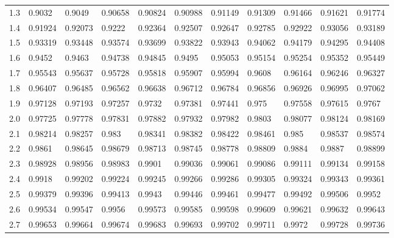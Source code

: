\documentclass[%
11pt,%
twoside,%
titlepage,%
german,%
headsepline%
]{scrartcl}
\newcommand{\spaltenheight}{\rule{0mm}{3ex}}
\begin{document}
\begin{table}[]
{\begin{tabular}{l|llllllllll}
\rowcolor{Gray}\spaltenheight 1.3 & 0.9032  & 0.9049  & 0.90658 & 0.90824 & 0.90988 & 0.91149 & 0.91309 & 0.91466 & 0.91621 & 0.91774 \\
\rowcolor{lightyellow}\spaltenheight 1.4 & 0.91924 & 0.92073 & 0.9222  & 0.92364 & 0.92507 & 0.92647 & 0.92785 & 0.92922 & 0.93056 & 0.93189 \\
\rowcolor{Gray}\spaltenheight 1.5 & 0.93319 & 0.93448 & 0.93574 & 0.93699 & 0.93822 & 0.93943 & 0.94062 & 0.94179 & 0.94295 & 0.94408 \\
\rowcolor{lightyellow}\spaltenheight 1.6 & 0.9452  & 0.9463  & 0.94738 & 0.94845 & 0.9495  & 0.95053 & 0.95154 & 0.95254 & 0.95352 & 0.95449 \\
\rowcolor{Gray}\spaltenheight 1.7 & 0.95543 & 0.95637 & 0.95728 & 0.95818 & 0.95907 & 0.95994 & 0.9608  & 0.96164 & 0.96246 & 0.96327 \\
\rowcolor{lightyellow}\spaltenheight 1.8 & 0.96407 & 0.96485 & 0.96562 & 0.96638 & 0.96712 & 0.96784 & 0.96856 & 0.96926 & 0.96995 & 0.97062 \\
\rowcolor{Gray}\spaltenheight 1.9 & 0.97128 & 0.97193 & 0.97257 & 0.9732  & 0.97381 & 0.97441 & 0.975   & 0.97558 & 0.97615 & 0.9767  \\
\rowcolor{lightyellow}\spaltenheight 2.0   & 0.97725 & 0.97778 & 0.97831 & 0.97882 & 0.97932 & 0.97982 & 0.9803  & 0.98077 & 0.98124 & 0.98169 \\
\rowcolor{Gray}\spaltenheight 2.1 & 0.98214 & 0.98257 & 0.983   & 0.98341 & 0.98382 & 0.98422 & 0.98461 & 0.985   & 0.98537 & 0.98574 \\
\rowcolor{lightyellow}\spaltenheight 2.2 & 0.9861  & 0.98645 & 0.98679 & 0.98713 & 0.98745 & 0.98778 & 0.98809 & 0.9884  & 0.9887  & 0.98899 \\
\rowcolor{Gray}\spaltenheight 2.3 & 0.98928 & 0.98956 & 0.98983 & 0.9901  & 0.99036 & 0.99061 & 0.99086 & 0.99111 & 0.99134 & 0.99158 \\
\rowcolor{lightyellow}\spaltenheight 2.4 & 0.9918  & 0.99202 & 0.99224 & 0.99245 & 0.99266 & 0.99286 & 0.99305 & 0.99324 & 0.99343 & 0.99361 \\
\rowcolor{Gray}\spaltenheight 2.5 & 0.99379 & 0.99396 & 0.99413 & 0.9943  & 0.99446 & 0.99461 & 0.99477 & 0.99492 & 0.99506 & 0.9952  \\
\rowcolor{lightyellow}\spaltenheight 2.6 & 0.99534 & 0.99547 & 0.9956  & 0.99573 & 0.99585 & 0.99598 & 0.99609 & 0.99621 & 0.99632 & 0.99643 \\
\rowcolor{Gray}\spaltenheight 2.7 & 0.99653 & 0.99664 & 0.99674 & 0.99683 & 0.99693 & 0.99702 & 0.99711 & 0.9972  & 0.99728 & 0.99736 \\

\end{tabular}}
\end{table}
\end{document}
